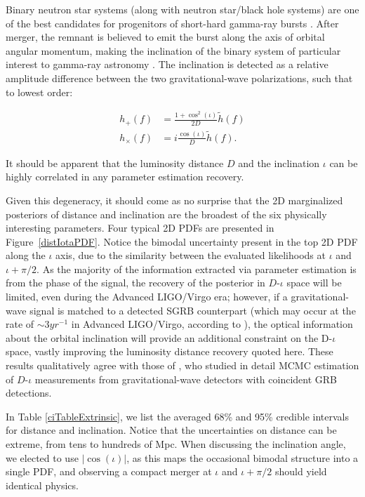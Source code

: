 \documentclass[11pt,a4paper]{emulateapj} 
\newcommand{\carl}[1]{{\color{red} #1}}
\begin{document}
Binary neutron star systems (along with neutron star/black hole
systems) are one of the best candidates for progenitors of short-hard
gamma-ray bursts \citep[and references therein]{Nakar2007}.  After
merger, the remnant is believed to emit the burst along the axis of
orbital angular momentum, making the inclination of the binary system
of particular interest to gamma-ray astronomy
\citep{LSCGRB2010,Corsi2012}.  The inclination is detected as a
relative amplitude difference between the two gravitational-wave
polarizations, such that to lowest order:

\begin{align}
h_+(f) &= \frac{1+\cos^2(\iota)}{2 D} \tilde{h}(f) \nonumber
\\ h_\times(f) &= i \frac{\cos(\iota)}{D}\tilde{h}(f) .
\end{align}

\noindent It should be apparent that the luminosity distance $D$ and
the inclination $\iota$ can be highly correlated in any parameter
estimation recovery.

Given this degeneracy, it should come as no surprise that the 2D
marginalized posteriors of distance and inclination are the broadest
of the six physically interesting parameters.  Four typical 2D PDFs
are presented in Figure~\ref{distIotaPDF}.  Notice the bimodal
uncertainty present in the top 2D PDF along the $\iota$ axis, due to
the similarity between the evaluated likelihoods at $\iota$ and $\iota
+ \pi/2$.  As the majority of the information extracted via parameter
estimation is from the phase of the signal, the recovery of the
posterior in $D$-$\iota$ space will be limited, even during the
Advanced LIGO/Virgo era; however, if a gravitational-wave signal is
matched to a detected SGRB counterpart (which may occur at the rate of
$\sim 3 yr^{-1}$ in Advanced LIGO/Virgo, according to
\cite{Metzger2013}), the optical information about the orbital
inclination will provide an additional constraint on the D-$\iota$
space, vastly improving the luminosity distance recovery quoted here.  These results
qualitatively agree with those of \cite{Nissanke2011}, who studied in detail
MCMC estimation of $D$-$\iota$ measurements from gravitational-wave detectors with 
coincident GRB detections.
 
 
In Table \ref{ciTableExtrinsic}, we list the averaged 68\% and 95\% credible
intervals for distance and inclination.  Notice that the uncertainties
on distance can be extreme, from tens to hundreds of Mpc.  When
discussing the inclination angle, we elected to use $|\cos(\iota)|$,
as this maps the occasional bimodal structure into a single PDF, and
observing a compact merger at $\iota$ and $\iota + \pi/2$ should yield
identical physics.
\end{document}
